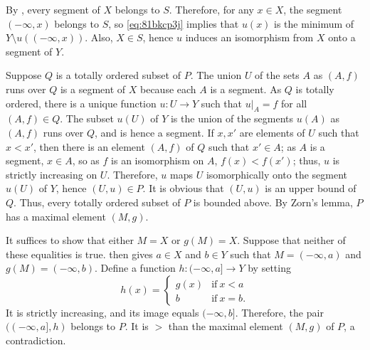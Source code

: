 \documentclass{article}
\begin{document}
\begin{solution}[\ref{exe:eghnwow2}]
  By , every segment of \(X\) belongs to \(S\).
  Therefore, for any \(x \in X\), the segment \((-\infty, x)\) belongs
  to \(S\), so \cref{eq:81bkcp3j} implies that \(u(x)\) is the minimum
  of \(Y \setminus u((-\infty, x))\).  Also, \(X \in S\), hence \(u\)
  induces an isomorphism from \(X\) onto a segment of \(Y\).
\end{solution}

\begin{solution}[\ref{exe:vgms7ihx}]
  \label{sol:cjc2vy2q}
  Suppose \(Q\) is a totally ordered subset of \(P\).  The union \(U\)
  of the sets \(A\) as \((A,f)\) runs over \(Q\) is a segment of \(X\)
  because each \(A\) is a segment.  As \(Q\) is totally ordered, there
  is a unique function \(u : U \to Y\) such that \(u \vert_A = f\) for
  all \((A,f) \in Q\).  The subset \(u(U)\) of \(Y\) is the union of
  the segments \(u(A)\) as \((A,f)\) runs over \(Q\), and is hence a
  segment.  If \(x,x'\) are elements of \(U\) such that \(x < x'\),
  then there is an element \((A,f)\) of \(Q\) such that \(x' \in A\);
  as \(A\) is a segment, \(x \in A\), so as \(f\) is an isomorphism on
  \(A\), \(f(x) < f(x')\); thus, \(u\) is strictly increasing on
  \(U\).  Therefore, \(u\) maps \(U\) isomorphically onto the segment
  \(u(U)\) of \(Y\), hence \((U,u) \in P\).  It is obvious that
  \((U,u)\) is an upper bound of \(Q\).  Thus, every totally ordered
  subset of \(P\) is bounded above.  By Zorn's lemma, \(P\) has a
  maximal element \((M, g)\).

  It suffices to show that either \(M = X\) or \(g(M) = X\).  Suppose
  that neither of these equalities is true.   then
  gives \(a \in X\) and \(b \in Y\) such that \(M = (-\infty, a)\) and
  \(g(M) = (-\infty, b)\).  Define a function
  \(h : (-\infty, a] \to Y\) by setting
  \begin{displaymath}
    h(x) =
    \begin{cases}
      g(x) & \text{if} ~ x < a \\
      b & \text{if} ~ x = b.
    \end{cases}
  \end{displaymath}
  It is strictly increasing, and its image equals \((-\infty, b]\).
  Therefore, the pair \(((-\infty, a], h)\) belongs to \(P\).  It is
  \(>\) than the maximal element \((M, g)\) of \(P\), a contradiction.
\end{solution}
\end{document}
